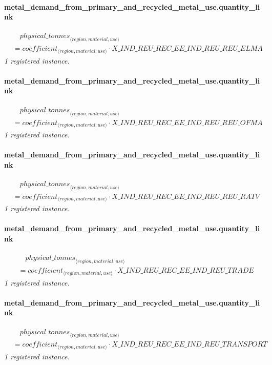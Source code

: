 \documentclass[11pt]{article}
\begin{document}
\paragraph{metal\_demand\_from\_primary\_and\_recycled\_metal\_use.quantity\_link}
\begin{align*}
&\quad {physical\_tonnes}_{\langle region, material, use\rangle}\\
&= coefficient_{\langle region, material, use\rangle} \cdot X\_IND\_REU\_REC\_EE\_IND\_REU\_REU\_ELMA
\end{align*}
\noindent\emph{1 registered instance.}\par
\paragraph{metal\_demand\_from\_primary\_and\_recycled\_metal\_use.quantity\_link}
\begin{align*}
&\quad {physical\_tonnes}_{\langle region, material, use\rangle}\\
&= coefficient_{\langle region, material, use\rangle} \cdot X\_IND\_REU\_REC\_EE\_IND\_REU\_REU\_OFMA
\end{align*}
\noindent\emph{1 registered instance.}\par
\paragraph{metal\_demand\_from\_primary\_and\_recycled\_metal\_use.quantity\_link}
\begin{align*}
&\quad {physical\_tonnes}_{\langle region, material, use\rangle}\\
&= coefficient_{\langle region, material, use\rangle} \cdot X\_IND\_REU\_REC\_EE\_IND\_REU\_REU\_RATV
\end{align*}
\noindent\emph{1 registered instance.}\par
\paragraph{metal\_demand\_from\_primary\_and\_recycled\_metal\_use.quantity\_link}
\begin{align*}
&\quad {physical\_tonnes}_{\langle region, material, use\rangle}\\
&= coefficient_{\langle region, material, use\rangle} \cdot X\_IND\_REU\_REC\_EE\_IND\_REU\_TRADE
\end{align*}
\noindent\emph{1 registered instance.}\par
\paragraph{metal\_demand\_from\_primary\_and\_recycled\_metal\_use.quantity\_link}
\begin{align*}
&\quad {physical\_tonnes}_{\langle region, material, use\rangle}\\
&= coefficient_{\langle region, material, use\rangle} \cdot X\_IND\_REU\_REC\_EE\_IND\_REU\_TRANSPORT
\end{align*}
\noindent\emph{1 registered instance.}\par
\end{document}
